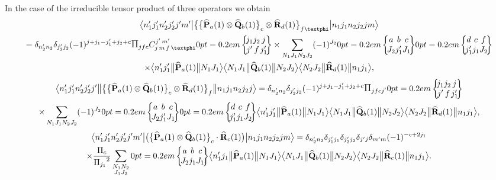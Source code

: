 In the case of the irreducible tensor product of three operators we obtain
\begin{multline}
\braOket{ n_{1}^{\prime} j_{1}^{\prime} n_{2}^{\prime} j_{2}^{\prime} j^{\prime} m^{\prime}}{\bigl\{\bigl\{\widehat{\vect{P}}_{a}(1) \otimes \widehat{\vect{Q}}_{b}(1)\bigr\}_{c} \otimes \widehat{\vect{R}}_{d}(1)\bigr\}_{f \varphi}}{n_{1} j_{1} n_{2} j_{2} j m} \\
=\delta_{n_{2}^{\prime} n_{2}} \delta_{j_{2}^{\prime} j_{2}}(-1)^{j+j_{1}-j_{1}^{\prime}+j_{2}+c} \Fact{j f c} 
\clebsch{j}{m}{f}{\varphi}{j^{\prime}}{m^{\prime}}
\sixj{j_{1}}{j_{2}}{j}{j^{\prime}}{f}{j_{1}^{\prime}} \times \sum_{N_{1} J_{1} N_{2} J_{2}}(-1)^{J_{2}}
\sixj{a}{b}{c}{J_{2}}{j_{1}^{\prime}}{J_{1}}
\sixj{d}{c}{f}{j_{1}^{\prime}}{j_{1}}{J_{2}} \\
\times
\braOketred{ n_{1}^{\prime} j_{1}^{\prime}}{\widehat{\vect{P}}_{a}(1)}{ N_{1} J_{1}}
\braOketred{ N_{1} J_{1}}{\widehat{\vect{Q}}_{b}(1)}{ N_{2} J_{2}}
\braOketred{ N_{2} J_{2}}{\widehat{\vect{R}}_{d}(1)}{ n_{1} j_{1}} , \label{eq:13:1:44}
\end{multline}
\begin{multline*}
\braOketred{ n_{1}^{\prime} j_{1}^{\prime} n_{2}^{\prime} j_{2}^{\prime} j^{\prime}}{\bigl\{\bigl\{\widehat{\vect{P}}_{a}(1) \otimes \widehat{\vect{Q}}_{b}(1)\bigr\}_{c} \otimes \widehat{\vect{R}}_{d}(1)\bigr\}_{f}}{n_{1} j_{1} n_{2} j_{2} j}
=\delta_{n_{2}^{\prime} n_{2}} \delta_{j_{2}^{\prime} j_{2}}(-1)^{j+j_{1}-j_{1}^{\prime}+j_{2}+c} \Fact{j f c j^{\prime}}
\sixj{j_{1}}{j_{2}}{j}{j^{\prime}}{f}{j_{1}^{\prime}} \\
\times \sum_{N_{1} J_{1} N_{2} J_{2}}(-1)^{J_{2}}
\sixj{a}{b}{c}{J_{2}}{j_{1}^{\prime}}{J_{1}}
\sixj{d}{c}{f}{j_{1}^{\prime}}{j_{1}}{J_{2}}
\braOketred{ n_{1}^{\prime} j_{1}^{\prime}}{\widehat{\vect{P}}_{a}(1)}{ N_{1} J_{1}}
\braOketred{ N_{1} J_{1}}{\widehat{\vect{Q}}_{b}(1)}{ N_{2} J_{2}}
\braOketred{ N_{2} J_{2}}{\widehat{\vect{R}}_{d}(1)}{ n_{1} j_{1}} ,
\end{multline*}
\begin{multline}
\braOket{ n_{1}^{\prime} j_{1}^{\prime} n_{2}^{\prime} j_{2}^{\prime} j^{\prime} m^{\prime}}{\bigl(\bigl\{\widehat{\vect{P}}_{a}(1) \otimes \widehat{\vect{Q}}_{b}(1)\bigr\}_{c} \cdot \widehat{\vect{R}}_{c}(1)\bigr)}{n_{1} j_{1} n_{2} j_{2} j m}=\delta_{n_{2}^{\prime} n_{2}} \delta_{j_{1}^{\prime} j_{1}} \delta_{j_{2}^{\prime} j_{2}} \delta_{j^{\prime} j} \delta_{m^{\prime} m}(-1)^{-c+2 j_{1}}\\
\times \frac{\Fact{c}}{\Fact{j_{1}}^{2}} \sum_{\substack{N_{1} N_{2} \\ J_{1} J_{2}}}
\sixj{a}{b}{c}{J_{2}}{j_{1}}{J_{1}}
\braOketred{ n_{1}^{\prime} j_{1}}{\widehat{\vect{P}}_{a}(1)}{ N_{1} J_{1}}
\braOketred{ N_{1} J_{1}}{\widehat{\vect{Q}}_{b}(1)}{ N_{2} J_{2}}
\braOketred{ N_{2} J_{2}}{\widehat{\vect{R}}_{c}(1)}{ n_{1} j_{1}}. \label{eq:13:1:45}
\end{multline}
